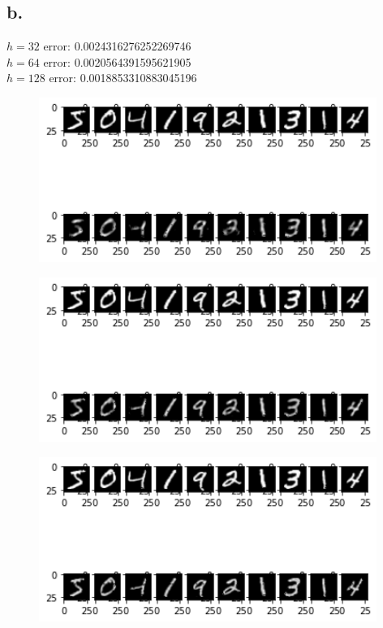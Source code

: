 \documentclass{article}
\newcommand{\1}{\mathbf{1}}
\begin{document}
{\subsection*{b.}

$h = 32$ error: 0.0024316276252269746 \\
$h = 64$ error: 0.0020564391595621905 \\
$h = 128$ error: 0.0018853310883045196 \\

\begin{figure}[!hb]
  \centering
  \includegraphics[width=110mm]{../hw4-code/results/a4_b32.png}
\end{figure}

\begin{figure}[!hb]
  \centering
  \includegraphics[width=110mm]{../hw4-code/results/a4_b64.png}
\end{figure}

\begin{figure}[!hb]
  \centering
  \includegraphics[width=110mm]{../hw4-code/results/a4_b128.png}
\end{figure}

}
\end{document}
